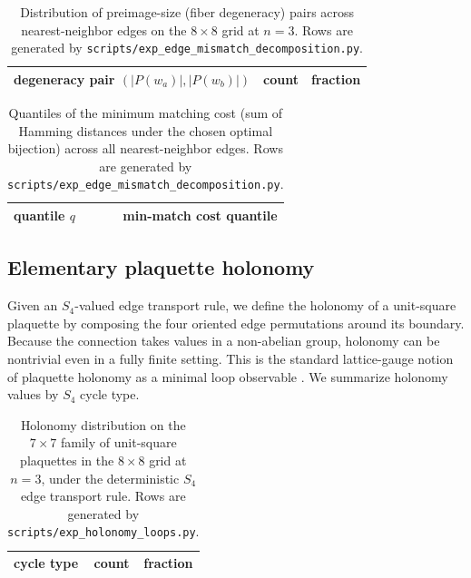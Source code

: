 \begin{table}[t]
\centering
\small
\setlength{\tabcolsep}{6pt}
\renewcommand{\arraystretch}{1.15}
\begin{tabular}{lrr}
\toprule
degeneracy pair $(|P(w_a)|,|P(w_b)|)$ & count & fraction \\
\midrule
%
\end{tabular}
\caption{Distribution of preimage-size (fiber degeneracy) pairs across nearest-neighbor edges on the $8\times 8$ grid at $n=3$. Rows are generated by \texttt{scripts/exp\_edge\_mismatch\_decomposition.py}.}
\label{tab:edge_deg_pairs}
\end{table}

\begin{table}[t]
\centering
\small
\setlength{\tabcolsep}{10pt}
\renewcommand{\arraystretch}{1.15}
\begin{tabular}{lr}
\toprule
quantile $q$ & min-match cost quantile \\
\midrule
%
\end{tabular}
\caption{Quantiles of the minimum matching cost (sum of Hamming distances under the chosen optimal bijection) across all nearest-neighbor edges. Rows are generated by \texttt{scripts/exp\_edge\_mismatch\_decomposition.py}.}
\label{tab:edge_cost_quantiles}
\end{table}

\subsection{Elementary plaquette holonomy}
\label{subsec:plaquette_holonomy}

Given an $S_4$-valued edge transport rule, we define the holonomy of a unit-square plaquette by composing the four oriented edge permutations around its boundary.
Because the connection takes values in a non-abelian group, holonomy can be nontrivial even in a fully finite setting.
This is the standard lattice-gauge notion of plaquette holonomy as a minimal loop observable \cite{Wilson1974,Rothe2012}.
We summarize holonomy values by $S_4$ cycle type.

\begin{table}[t]
\centering
\small
\setlength{\tabcolsep}{10pt}
\renewcommand{\arraystretch}{1.15}
\begin{tabular}{lrr}
\toprule
cycle type & count & fraction \\
\midrule
%
\end{tabular}
\caption{Holonomy distribution on the $7\times 7$ family of unit-square plaquettes in the $8\times 8$ grid at $n=3$, under the deterministic $S_4$ edge transport rule. Rows are generated by \texttt{scripts/exp\_holonomy\_loops.py}.}
\label{tab:holonomy_cycle_types}
\end{table}

